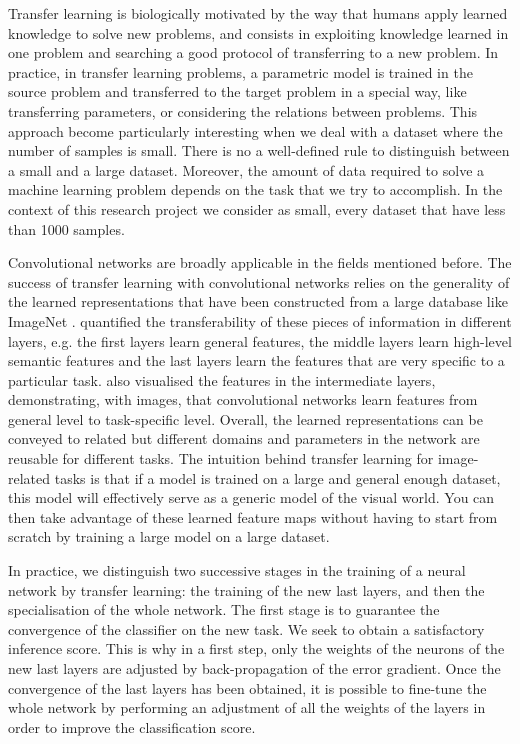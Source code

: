 Transfer learning is biologically motivated by the way that humans apply learned knowledge to solve new problems, and consists in exploiting knowledge learned in one problem and searching a good protocol of transferring to a new problem.
In practice, in transfer learning problems, a parametric model is trained in the source problem and transferred to the target problem in a special way, like transferring parameters, or considering the relations between problems. This approach become particularly interesting when we deal with a dataset where the number of samples is small. There is no a well-defined rule to distinguish between a small and a large dataset. Moreover, the amount of data required to solve a machine learning problem depends on the task that we try to accomplish. In the context of this research project we consider as small, every dataset that have less than 1000 samples. 

Convolutional networks are broadly applicable in the fields mentioned before. The success of transfer learning with convolutional networks relies on the generality of the learned representations that have been constructed from a large database like ImageNet \citep{deng2009imagenet}. \citet{yosinski2014transferable} quantified the transferability of these pieces of information in different layers, e.g. the first layers learn general features, the middle layers learn high-level semantic features and the last layers learn the features that are very specific to a particular task. \citet{zeiler2014visualizing} also visualised the features in the intermediate layers, demonstrating, with images, that convolutional networks learn features from general level to task-specific level. Overall, the learned representations can be conveyed to related but different domains and parameters in the network are reusable for different tasks. The intuition behind transfer learning for image-related tasks is that if a model is trained on a large and general enough dataset, this model will effectively serve as a generic model of the visual world. You can then take advantage of these learned feature maps without having to start from scratch by training a large model on a large dataset.

In practice, we distinguish two successive stages in the training of a neural network by transfer learning: the training of the new last layers, and then the specialisation of the whole network. The first stage is to guarantee the convergence of the classifier on the new task. We seek to obtain a satisfactory inference score. This is why in a first step, only the weights of the neurons of the new last layers are adjusted by back-propagation of the error gradient. Once the convergence of the last layers has been obtained, it is possible to fine-tune the whole network by performing an adjustment of all the weights of the layers in order to improve the classification score.


